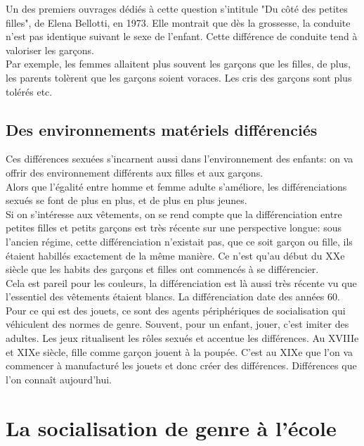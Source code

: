 \documentclass[10pt, a4paper, openany]{book}
\begin{document}
Un des premiers ouvrages dédiés à cette question s'intitule "Du côté des petites filles", de Elena Bellotti, en 1973. Elle montrait que dès la grossesse, la conduite n'est pas identique suivant le sexe de l'enfant. Cette différence de conduite tend à valoriser les garçons. \\
Par exemple, les femmes allaitent plus souvent les garçons que les filles, de plus, les parents tolèrent que les garçons soient voraces. Les cris des garçons sont plus tolérés etc. \\

\subsection{Des environnements matériels différenciés}

Ces différences sexuées s'incarnent aussi dans l'environnement des enfants: on va offrir des environnement différents aux filles et aux garçons. \\ 
Alors que l'égalité entre homme et femme adulte s'améliore, les différenciations sexués se font de plus en plus, et de plus en plus jeunes. \\
Si on s'intéresse aux vêtements, on se rend compte que la différenciation entre petites filles et petits garçons est très récente sur une perspective longue: sous l'ancien régime, cette différenciation n'existait pas, que ce soit garçon ou fille, ils étaient habillés exactement de la même manière. Ce n'est qu'au début du XXe siècle que les habits des garçons et filles ont commencés à se différencier. \\ 
Cela est pareil pour les couleurs, la différenciation est là aussi très récente vu que l'essentiel des vêtements étaient blancs. La différenciation date des années 60. \\
Pour ce qui est des jouets, ce sont des agents périphériques de socialisation qui véhiculent des normes de genre. Souvent, pour un enfant, jouer, c'est imiter des adultes. Les jeux ritualisent les rôles sexués et accentue les différences. Au XVIIIe et XIXe siècle, fille comme garçon jouent à la poupée. C'est au XIXe que l'on va commencer à manufacturé les jouets et donc créer des différences. Différences que l'on connaît aujourd'hui.

\section{La socialisation de genre à l'école}
\end{document}

